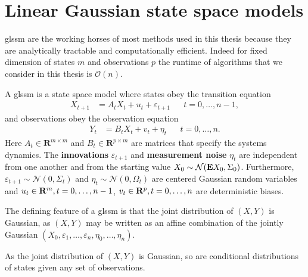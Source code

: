 
\section{Linear Gaussian state space models}
\label{sec:linear_gaussian_state_space_models}

\gls{glssm} are the working horses of most methods used in this thesis because they are analytically tractable and computationally efficient. Indeed for fixed dimension of states $m$ and observations $p$ the runtime of algorithms that we consider in this thesis is $\mathcal O(n)$.

\begin{definition}
    \label{def:glssm}
    A \gls{glssm} is a state space model where states obey the transition equation
    \begin{align}
        \label{eq:glssm_states}
        X_{t + 1} & = A_{t}X_{t} + u_{t} + \varepsilon_{t + 1} &  & t = 0, \dots, n - 1,
    \end{align}
    and observations obey the observation equation
    \begin{align}
        \label{eq:glssm_observations}
        Y_{t} & = B_{t}X_{t} + v_{t} + \eta_{t} &  & t = 0, \dots, n.
    \end{align}
    Here $A_{t} \in \mathbf{R}^{m \times m}$ and $B_{t} \in \mathbf{R}^{p \times m}$ are matrices that specify the systems dynamics. The \textbf{innovations} $\varepsilon_{t + 1}$ and \textbf{measurement noise} $\eta_{t}$ are independent from one another and from the starting value $X_{0} \sim \mathcal N (\mathbf E X_{0}, \Sigma_{0})$. Furthermore, $\varepsilon_{t+1} \sim \mathcal N(0, \Sigma_{t})$ and $\eta_{t}\sim \mathcal N(0, \Omega_{t})$ are centered Gaussian random variables and $u_{t} \in \mathbf R^{m}, t = 0, \dots, n - 1$, $v_{t} \in \mathbf R^{p}, t = 0, \dots, n$ are deterministic biases.
\end{definition}

The defining feature of a \gls{glssm} is that the joint distribution of $(X,Y)$ is Gaussian, as $(X,Y)$ may be written as an affine combination of the jointly Gaussian $(X_{0}, \varepsilon_{1}, \dots, \varepsilon_{n}, \eta_{0}, \dots, \eta_{n})$. 

As the joint distribution of $(X, Y)$ is Gaussian, so are conditional distributions of states given any set of observations.

